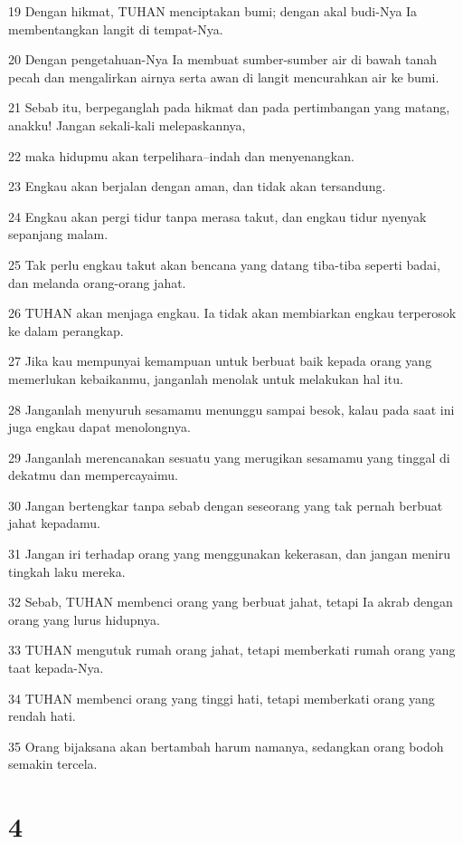 \par 19 Dengan hikmat, TUHAN menciptakan bumi; dengan akal budi-Nya Ia membentangkan langit di tempat-Nya.
\par 20 Dengan pengetahuan-Nya Ia membuat sumber-sumber air di bawah tanah pecah dan mengalirkan airnya serta awan di langit mencurahkan air ke bumi.
\par 21 Sebab itu, berpeganglah pada hikmat dan pada pertimbangan yang matang, anakku! Jangan sekali-kali melepaskannya,
\par 22 maka hidupmu akan terpelihara--indah dan menyenangkan.
\par 23 Engkau akan berjalan dengan aman, dan tidak akan tersandung.
\par 24 Engkau akan pergi tidur tanpa merasa takut, dan engkau tidur nyenyak sepanjang malam.
\par 25 Tak perlu engkau takut akan bencana yang datang tiba-tiba seperti badai, dan melanda orang-orang jahat.
\par 26 TUHAN akan menjaga engkau. Ia tidak akan membiarkan engkau terperosok ke dalam perangkap.
\par 27 Jika kau mempunyai kemampuan untuk berbuat baik kepada orang yang memerlukan kebaikanmu, janganlah menolak untuk melakukan hal itu.
\par 28 Janganlah menyuruh sesamamu menunggu sampai besok, kalau pada saat ini juga engkau dapat menolongnya.
\par 29 Janganlah merencanakan sesuatu yang merugikan sesamamu yang tinggal di dekatmu dan mempercayaimu.
\par 30 Jangan bertengkar tanpa sebab dengan seseorang yang tak pernah berbuat jahat kepadamu.
\par 31 Jangan iri terhadap orang yang menggunakan kekerasan, dan jangan meniru tingkah laku mereka.
\par 32 Sebab, TUHAN membenci orang yang berbuat jahat, tetapi Ia akrab dengan orang yang lurus hidupnya.
\par 33 TUHAN mengutuk rumah orang jahat, tetapi memberkati rumah orang yang taat kepada-Nya.
\par 34 TUHAN membenci orang yang tinggi hati, tetapi memberkati orang yang rendah hati.
\par 35 Orang bijaksana akan bertambah harum namanya, sedangkan orang bodoh semakin tercela.

\chapter{4}

